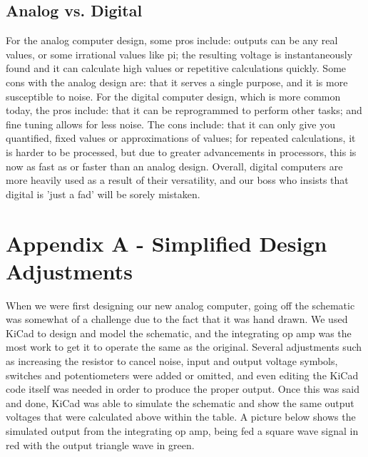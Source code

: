 \documentclass[11pt]{article}
\begin{document}
\subsection *{Analog vs. Digital}
	For the analog computer design, some pros include: outputs can be any real values, or some irrational values like pi; the resulting voltage is instantaneously found and it can calculate high values or repetitive calculations quickly. Some cons with the analog design are: that it serves a single purpose, and it is more susceptible to noise. 
	For the digital computer design, which is more common today, the pros include: that it can be reprogrammed to perform other tasks; and fine tuning allows for less noise. The cons include: that it can only give you quantified, fixed values or approximations of values; for repeated calculations, it is harder to be processed, but due to greater advancements in processors, this is now as fast as or faster than an analog design. Overall, digital computers are more heavily used as a result of their versatility, and our boss who insists that digital is 'just a fad' will be sorely mistaken.  \\
	\newpage
\section*{Appendix A - Simplified Design Adjustments}
	When we were first designing our new analog computer, going off the schematic was somewhat of a challenge due to the fact that it was hand drawn. We used KiCad to design and model the schematic, and the integrating op amp was the most work to get it to operate the same as the original. 
	Several adjustments such as increasing the resistor to cancel noise, input and output voltage symbols, switches and potentiometers were added or omitted, and even editing the KiCad code itself was needed in order to produce the proper output. Once this was said and done, KiCad was able to simulate the schematic and show the same output voltages that were calculated above within the table. 
	A picture below shows the simulated output from the integrating op amp, being fed a square wave signal in red with the output triangle wave in green.
	 
	
\end{document}
